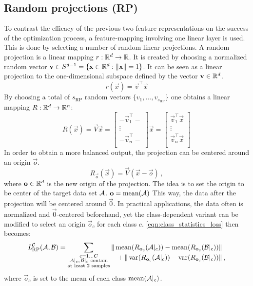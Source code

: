 \subsection{Random projections (RP)}
To contrast the efficacy of the previous two feature-representations on the success of the optimization process,
a feature-mapping involving one linear layer is used. This is done by selecting a number of  random linear projections.
A random projection is a linear mapping $r: \mathbb{R}^d \to \mathbb{R}$.
It is created by choosing a normalized random vector $\mathbf v \in S^{d-1} = \{\mathbf x \in \mathbb{R}^d : \|\mathbf x\| = 1\}$.
It can be seen as a linear projection to the one-dimensional subspace defined by the vector $\mathbf v \in \mathbb{R}^d$.
\[
    r(\vec x) = \vec v ^\top \vec x
\]
By choosing a total of $s_\text{RP}$ random vectors $\{v_1, \dots, v_{s_\text{RP}}\}$ one obtains a linear mapping $R: \mathbb{R}^d \to \mathbb{R}^n$:
\[
    R(\vec x) = \vec V \vec x =
    \begin{bmatrix}
        - \vec v_1 ^\top - \\
        \vdots \\
        - \vec v_n ^\top - \\
    \end{bmatrix}
    \vec x =
    \begin{bmatrix}
        \vec v_1 ^\top \vec x \\
        \vdots \\
        \vec v_n ^\top \vec x \\
    \end{bmatrix}
\]
%
In order to obtain a more balanced output,
the projection can be centered around an origin $\vec o$.
% 
\[
    R_{\vec o} (\vec x) = \vec V (\vec x - \vec o) \,,
\]
where $\mathbf o \in \mathbb{R}^d$ is the new origin of the projection. 
The idea is to set the origin to be center of the target data set $\mathcal A$. $\mathbf o = \operatorname{mean} (\mathcal A)$
This way, the data after the projection will be centered around $\vec 0$.
In practical applications, the data often is normalized and $\vec 0$-centered beforehand,
yet the class-dependent variant can be modified to select an origin $\vec o_c$ for each class $c$.
\cref{eqn:class_statistics_loss} then becomes:
% 
\begin{equation*}
    \textit{L} _{\text{RP}} ^{\mathcal C} (\mathcal A, \mathcal B) =
    \sum _{\substack{c = 1 \dots C \\ \mathcal A|_c,\, \mathcal B|_c \text{ contain} \\ \text{at least 2 samples}}}
    \begin{alignedat}[t]{1}
        \|\operatorname{mean} ({R_{\mathbf o_c} (\mathcal A|_c)}) - \operatorname{mean} ({R_{\mathbf o_c} (\mathcal B|_c)}) &\| \\
        {} + \|\operatorname{var} ({R_{\mathbf o_c} (\mathcal A|_c)}) - \operatorname{var} ({R_{\mathbf o_c} (\mathcal B|_c)}) &\|  \,,
    \end{alignedat}
\end{equation*}
%
where $\vec o_c$ is set to the mean of each class $\operatorname{mean} ({\mathcal A|_c})$.


